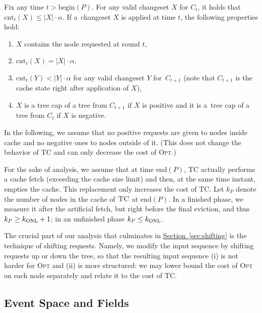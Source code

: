 \documentclass[sigconf,screen=true]{acmart}
\newcommand{\lref}[2][]{\hyperref[#2]{#1~\ref*{#2}}}
\newcommand{\ALG}{\textsc{TC}\xspace}
\newcommand{\OPT}{\textsc{Opt}\xspace}
\newcommand{\cnt}{\textrm{cnt}}
\newcommand{\beP}{\textrm{begin}(P)}
\newcommand{\enP}{\textrm{end}(P)}
\newcommand{\kALG}{k_\textnormal{ONL}}
\begin{document}
\begin{lemma}
\label{lem:no_over-requested_changesets}
Fix any time $t > \beP$. For any valid changeset $X$ for $C_t$, it holds that
$\cnt_t(X) \leq |X| \cdot \alpha$. If a~changeset $X$ is applied at time $t$,
the following properties hold:
\begin{enumerate}
\item $X$ contains the node requested at round $t$, 
\label{lemit:1}
\item $\cnt_t(X) = |X| \cdot \alpha$, 
\label{lemit:2}
\item $\cnt_t(Y) < |Y| \cdot \alpha$ for any valid changeset $Y$ for~$C_{t+1}$
(note that $C_{t+1}$ is the cache state right after application of $X$),
\label{lemit:3}
\item $X$ is a tree cap of a tree from $C_{t+1}$ if
$X$ is positive and it is a~tree cap of a tree from $C_t$ if $X$ is
negative.
\label{lemit:4}
\end{enumerate}
\end{lemma}

In the following, we assume that no positive requests are given to nodes
inside cache and no negative ones to nodes outside of it. (This does not
change the behavior of \ALG and can only decrease the cost of \OPT.)

For the sake of analysis, we assume that at time $\enP$, \ALG actually
performs a cache fetch (exceeding the cache size limit) and then, at the same
time instant, empties the cache. This replacement only increases the cost of
\ALG. Let $k_P$ denote the number of nodes in the cache of $\ALG$ at $\enP$.
In a finished phase, we measure it after the artificial fetch, but right
before the final eviction, and thus $k_P \geq \kALG + 1$; in an unfinished
phase $k_P \leq \kALG$.

The crucial part of our analysis that culminates in
\lref[Section]{sec:shifting} is the technique of shifting requests. Namely, we
modify the input sequence by shifting requests up or down the tree, so that
the resulting input sequence (i) is not harder for \OPT and (ii) is more
structured: we may lower bound the cost of \OPT on each node separately and
relate it to the cost of \ALG.



\subsection{Event Space and Fields}
\label{sec:event}
\end{document}
